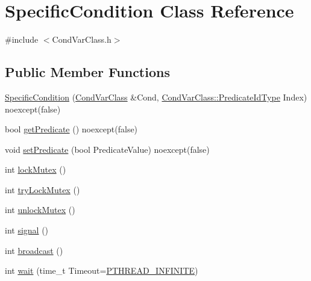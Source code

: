 \hypertarget{classSpecificCondition}{}\section{Specific\+Condition Class Reference}
\label{classSpecificCondition}


{\ttfamily \#include $<$Cond\+Var\+Class.\+h$>$}

\subsection*{Public Member Functions}
\begin{DoxyCompactItemize}
\item 
\hyperlink{classSpecificCondition_aeaad30c2483d565580a0c5def33a56bf}{Specific\+Condition} (\hyperlink{classCondVarClass}{Cond\+Var\+Class} \&Cond, \hyperlink{classCondVarClass_a8e27f99972b8b95f064d6657a4583a5b}{Cond\+Var\+Class\+::\+Predicate\+Id\+Type} Index) noexcept(false)
\item 
bool \hyperlink{classSpecificCondition_a136588886dab164bdb5ef1cbca9bd222}{get\+Predicate} () noexcept(false)
\item 
void \hyperlink{classSpecificCondition_ae339d4e8b0e0944887d6e81f284f834e}{set\+Predicate} (bool Predicate\+Value) noexcept(false)
\item 
int \hyperlink{classSpecificCondition_aac09e84b11482d7651a7001a6a0757cd}{lock\+Mutex} ()
\item 
int \hyperlink{classSpecificCondition_a408f84395e536d0e9ae0604e7ac3feb1}{try\+Lock\+Mutex} ()
\item 
int \hyperlink{classSpecificCondition_a8cdac09a54f900329b35a54349cbba44}{unlock\+Mutex} ()
\item 
int \hyperlink{classSpecificCondition_a8af0e884bb8b3d765b5a59761efdec04}{signal} ()
\item 
int \hyperlink{classSpecificCondition_a74ec8602bf6bc6de21faee0fb6910c2d}{broadcast} ()
\item 
int \hyperlink{classSpecificCondition_a56b9eb97c2713b979b54ce05534ff5c4}{wait} (time\+\_\+t Timeout=\hyperlink{PThreadClassLib_8h_a9d2d74d73cb5d069fbfcbcfebf42bd6e}{P\+T\+H\+R\+E\+A\+D\+\_\+\+I\+N\+F\+I\+N\+I\+TE})
\end{DoxyCompactItemize}
